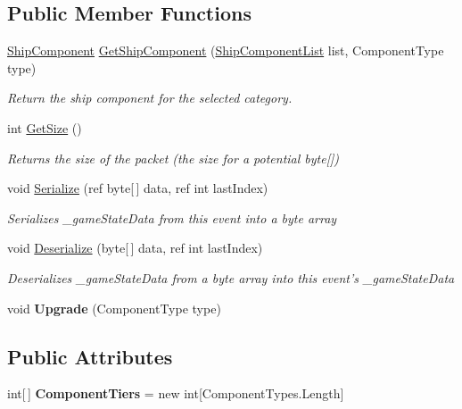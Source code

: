 \subsection*{Public Member Functions}
\begin{DoxyCompactItemize}
\item 
\hyperlink{class_skyrates_1_1_ship_1_1_ship_component}{Ship\-Component} \hyperlink{class_skyrates_1_1_ship_1_1_ship_data_a3ae55a2215158477e44bd7cb2a103e00}{Get\-Ship\-Component} (\hyperlink{class_skyrates_1_1_ship_1_1_ship_component_list}{Ship\-Component\-List} list, Component\-Type type)
\begin{DoxyCompactList}\small\item\em Return the ship component for the selected category. \end{DoxyCompactList}\item 
int \hyperlink{class_skyrates_1_1_ship_1_1_ship_data_ab97c57ac7d3485ed73997201194fed67}{Get\-Size} ()
\begin{DoxyCompactList}\small\item\em Returns the size of the packet (the size for a potential byte\mbox{[}\mbox{]}) \end{DoxyCompactList}\item 
void \hyperlink{class_skyrates_1_1_ship_1_1_ship_data_aecbf0716f2aa099de5398ad12a284560}{Serialize} (ref byte\mbox{[}$\,$\mbox{]} data, ref int last\-Index)
\begin{DoxyCompactList}\small\item\em Serializes \-\_\-game\-State\-Data from this event into a byte array \end{DoxyCompactList}\item 
void \hyperlink{class_skyrates_1_1_ship_1_1_ship_data_a5cdd978d0ede1a2d54c963e43ffd0eab}{Deserialize} (byte\mbox{[}$\,$\mbox{]} data, ref int last\-Index)
\begin{DoxyCompactList}\small\item\em Deserializes \-\_\-game\-State\-Data from a byte array into this event's \-\_\-game\-State\-Data \end{DoxyCompactList}\item 
\hypertarget{class_skyrates_1_1_ship_1_1_ship_data_a26d15f9c540e3b209766f09b82216b9a}{void {\bfseries Upgrade} (Component\-Type type)}\label{class_skyrates_1_1_ship_1_1_ship_data_a26d15f9c540e3b209766f09b82216b9a}

\end{DoxyCompactItemize}
\subsection*{Public Attributes}
\begin{DoxyCompactItemize}
\item 
\hypertarget{class_skyrates_1_1_ship_1_1_ship_data_ac15ddb6a284005e04a258433f76214d4}{int\mbox{[}$\,$\mbox{]} {\bfseries Component\-Tiers} = new int\mbox{[}Component\-Types.\-Length\mbox{]}}\label{class_skyrates_1_1_ship_1_1_ship_data_ac15ddb6a284005e04a258433f76214d4}

\end{DoxyCompactItemize}
